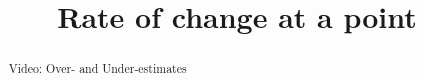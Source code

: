 \documentclass[handout]{ximera}
\title{Rate of change at a point}
\begin{document}
\begin{abstract} Video: Over- and Under-estimates %
\end{abstract}

\maketitle

\end{document}
